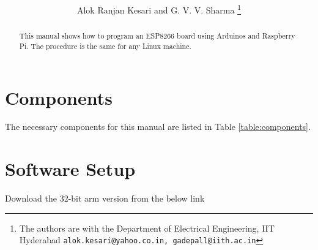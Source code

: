\documentclass[journal,12pt,twocolumn]{IEEEtran}
\begin{document}

\def\putbox#1#2#3{\makebox[0in][l]{\makebox[#1][l]{}\raisebox{\baselineskip}[0in][0in]{\raisebox{#2}[0in][0in]{#3}}}}
     \def\rightbox#1{\makebox[0in][r]{#1}}
     \def\centbox#1{\makebox[0in]{#1}}
     \def\topbox#1{\raisebox{-\baselineskip}[0in][0in]{#1}}
     \def\midbox#1{\raisebox{-0.5\baselineskip}[0in][0in]{#1}}

\vspace{3cm}

\title{
}%
\author{Alok Ranjan Kesari and G. V. V. Sharma%
\thanks{ The authors are with the Department of Electrical Engineering, IIT Hyderabad
        {\tt\small alok.kesari@yahoo.co.in, gadepall@iith.ac.in}}%

}





\tableofcontents


\begin{abstract}
This manual shows how to program an ESP8266 board using Arduinos and Raspberry Pi. The procedure is the same for any Linux machine.
\end{abstract}
\section{Components}
The necessary components for this manual are listed in Table \ref{table:components}.
\begin{table}[!h]
\centering

\caption{}
\label{table:components}
\end{table}
%
\section{Software Setup}
Download the 32-bit arm version from the below link
\end{document}
